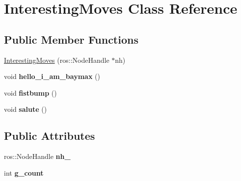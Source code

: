 \hypertarget{class_interesting_moves}{\section{Interesting\-Moves Class Reference}
\label{class_interesting_moves}
}
\subsection*{Public Member Functions}
\begin{DoxyCompactItemize}
\item 
\hyperlink{class_interesting_moves_a3861caf6f4ec3523c513f33710abb22f}{Interesting\-Moves} (ros\-::\-Node\-Handle $\ast$nh)
\item 
\hypertarget{class_interesting_moves_aa6a157ff74d5b8660738b9152ca8c12d}{void {\bfseries hello\-\_\-i\-\_\-am\-\_\-baymax} ()}\label{class_interesting_moves_aa6a157ff74d5b8660738b9152ca8c12d}

\item 
\hypertarget{class_interesting_moves_a3f547bb8630c78d1aef79bbbaa1da2c8}{void {\bfseries fistbump} ()}\label{class_interesting_moves_a3f547bb8630c78d1aef79bbbaa1da2c8}

\item 
\hypertarget{class_interesting_moves_a12d86b0ad41615998e786201692fe02d}{void {\bfseries salute} ()}\label{class_interesting_moves_a12d86b0ad41615998e786201692fe02d}

\end{DoxyCompactItemize}
\subsection*{Public Attributes}
\begin{DoxyCompactItemize}
\item 
\hypertarget{class_interesting_moves_a629036143f1130598964385cf240abd2}{ros\-::\-Node\-Handle {\bfseries nh\-\_\-}}\label{class_interesting_moves_a629036143f1130598964385cf240abd2}

\item 
\hypertarget{class_interesting_moves_aebdc7a1c2e81fcad2f3dd23aec1e2009}{int {\bfseries g\-\_\-count}}\label{class_interesting_moves_aebdc7a1c2e81fcad2f3dd23aec1e2009}

\end{DoxyCompactItemize}


